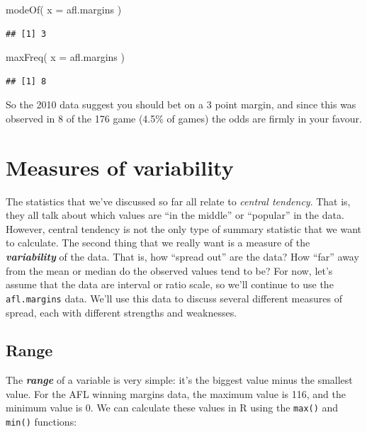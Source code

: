 \documentclass[
]{book}
\newenvironment{Shaded}{\begin{snugshade}}{\end{snugshade}}
\newcommand{\AttributeTok}[1]{\textcolor[rgb]{0.77,0.63,0.00}{#1}}
\newcommand{\FunctionTok}[1]{\textcolor[rgb]{0.00,0.00,0.00}{#1}}
\newcommand{\NormalTok}[1]{#1}
\begin{document}
\begin{Shaded}
\begin{Highlighting}[]
\FunctionTok{modeOf}\NormalTok{( }\AttributeTok{x =}\NormalTok{ afl.margins )}
\end{Highlighting}
\end{Shaded}

\begin{verbatim}
## [1] 3
\end{verbatim}

\begin{Shaded}
\begin{Highlighting}[]
\FunctionTok{maxFreq}\NormalTok{( }\AttributeTok{x =}\NormalTok{ afl.margins )}
\end{Highlighting}
\end{Shaded}

\begin{verbatim}
## [1] 8
\end{verbatim}

So the 2010 data suggest you should bet on a 3 point margin, and since this was observed in 8 of the 176 game (4.5\% of games) the odds are firmly in your favour.

\hypertarget{var}{%
\section{Measures of variability}\label{var}}

The statistics that we've discussed so far all relate to \emph{central tendency}. That is, they all talk about which values are ``in the middle'' or ``popular'' in the data. However, central tendency is not the only type of summary statistic that we want to calculate. The second thing that we really want is a measure of the \textbf{\emph{variability}} of the data. That is, how ``spread out'' are the data? How ``far'' away from the mean or median do the observed values tend to be? For now, let's assume that the data are interval or ratio scale, so we'll continue to use the \texttt{afl.margins} data. We'll use this data to discuss several different measures of spread, each with different strengths and weaknesses.

\hypertarget{range}{%
\subsection{Range}\label{range}}

The \textbf{\emph{range}} of a variable is very simple: it's the biggest value minus the smallest value. For the AFL winning margins data, the maximum value is 116, and the minimum value is 0. We can calculate these values in R using the \texttt{max()} and \texttt{min()} functions:
\end{document}
